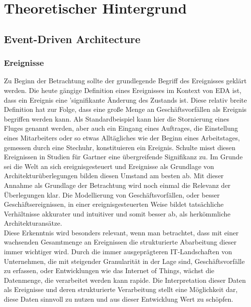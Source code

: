 \section{Theoretischer Hintergrund}
\subsection{Event-Driven Architecture}
\subsubsection*{Ereignisse}
Zu Beginn der Betrachtung sollte der grundlegende Begriff des Ereignisses geklärt werden. Die heute gängige Definition eines Ereignisses im Kontext von \ac*{EDA} ist, dass ein Ereignis eine 'signifikante Änderung des Zustands ist. \cite[Vgl.][S. 4]{EDA2006} Diese relativ breite Definition hat zur Folge, dass eine große Menge an Geschäftsvorfällen als Ereignis begriffen werden kann. Als Standardbeispiel kann hier die Stornierung eines Fluges genannt werden, aber auch ein Eingang eines Auftrages, die Einstellung eines Mitarbeiters oder so etwas Alltägliches wie der Beginn eines Arbeitstages, gemessen durch eine Stechuhr, konstituieren ein Ereignis. Schulte misst diesen Ereignissen in Studien für Gartner eine übergreifende Signifikanz zu. Im Grunde sei die Welt an sich ereignisgesteuert und Ereignisse als Grundlage von Architekturüberlegungen bilden diesen Umstand am besten ab. \cite[Vgl. ][S. 2]{schulte2003growing} Mit dieser Annahme als Grundlage der Betrachtung wird noch einmal die Relevanz der Überlegungen klar. Die Modellierung von Geschäftsvorfällen, oder besser Geschäftsereignissen, in einer ereignisgesteuerten Weise bildet tatsächliche Verhältnisse akkurater und intuitiver und somit besser ab, als herkömmliche Architekturansätze. \cite[Vgl. ][S. 13]{EDA2010} \\ Diese Erkenntnis wird besonders relevant, wenn man betrachtet, dass mit einer wachsenden Gesamtmenge an Ereignissen die strukturierte Abarbeitung dieser immer wichtiger wird. Durch die immer ausgeprägteren IT-Landschaften von Unternehmen, die mit steigender Granularität in der Lage sind, Geschäftsvorfälle zu erfassen, oder Entwicklungen wie das Internet of Things, wächst die Datenmenge, die verarbeitet werden kann rapide. Die Interpretation dieser Daten als Ereignisse und deren strukturierte Verarbeitung stellt eine Möglichkeit dar, diese Daten sinnvoll zu nutzen und aus dieser Entwicklung Wert zu schöpfen. \cite[Vgl. ][S. 16]{EDA2010} \\
